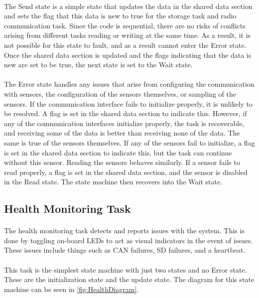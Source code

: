 \paragraph{}
The Send state is a simple state that updates the data in the shared data section and sets the flag that this data is new to true for the storage task and radio communication task.
Since the code is sequential, there are no risks of conflicts arising from different tasks reading or writing at the same time.
As a result, it is not possible for this state to fault, and as a result cannot enter the Error state.
Once the shared data section is updated and the flags indicating that the data is new are set to be true, the next state is set to the Wait state.

\paragraph{}
The Error state handles any issues that arise from configuring the communication with sensors, the configuration of the sensors themselves, or sampling of the sensors.
If the communication interface fails to initialize properly, it is unlikely to be resolved.
A flag is set in the shared data section to indicate this.
However, if any of the communication interfaces initialize properly, the task is recoverable, and receiving some of the data is better than receiving none of the data.
The same is true of the sensors themselves.
If any of the sensors fail to initialize, a flag is set in the shared data section to indicate this, but the task can continue without this sensor.
Reading the sensors behaves similarly.
If a sensor fails to read properly, a flag is set in the shared data section, and the sensor is disabled in the Read state.
The state machine then recovers into the Wait state.

\subsection{Health Monitoring Task}

\paragraph{}
The health monitoring task detects and reports issues with the system.
This is done by toggling on-board LEDs to act as visual indicators in the event of issues.
These issues include things such as CAN failures, SD failures, and a heartbeat.

\paragraph{}
This task is the simplest state machine with just two states and no Error state.
These are the initialization state and the update state.
The diagram for this state machine can be seen in \cref{fig:HealthDiagram}.

